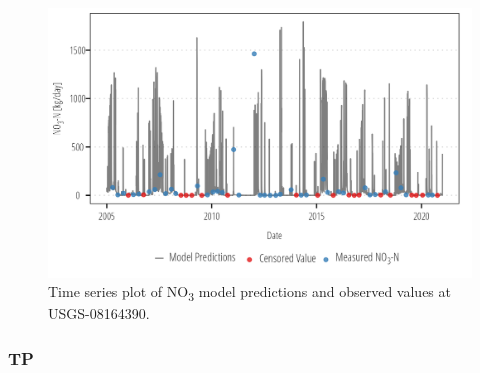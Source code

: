 \documentclass[
]{article}
\begin{document}
\begin{figure}[h]

{\centering \includegraphics{model_assessment_files/figure-pdf/unnamed-chunk-19-1.png}

}

\caption{Time series plot of NO\textsubscript{3} model predictions and
observed values at USGS-08164390.}

\end{figure}

\clearpage

\hypertarget{tp-1}{%
\subsubsection{TP}\label{tp-1}}
\end{document}
